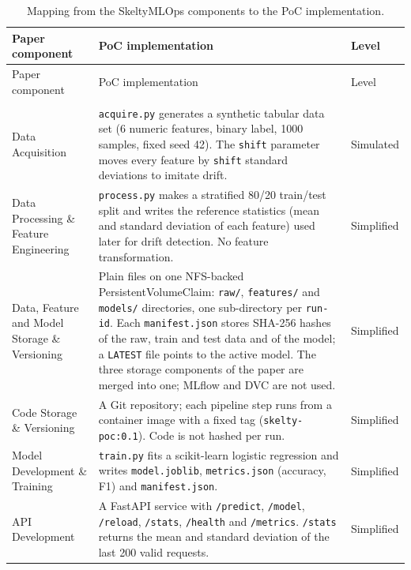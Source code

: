 {\small
\setlength{\tabcolsep}{4pt}
\begin{longtable}{@{}>{\raggedright\arraybackslash}p{3.7cm} >{\raggedright\arraybackslash}p{6.6cm} >{\raggedright\arraybackslash}p{1.9cm}@{}}
\caption{Mapping from the SkeltyMLOps components to the PoC implementation.}
\label{tab:poc-mapping}\\
\toprule
Paper component & PoC implementation & Level \\
\midrule
\endfirsthead
\toprule
Paper component & PoC implementation & Level \\
\midrule
\endhead
\midrule
\multicolumn{3}{r}{\footnotesize Continued on next page}\\
\endfoot
\bottomrule
\endlastfoot

Data Acquisition & \texttt{acquire.py} generates a synthetic tabular data set (6 numeric features, binary label, 1000 samples, fixed seed 42). The \texttt{shift} parameter moves every feature by \texttt{shift} standard deviations to imitate drift. & Simulated \\
Data Processing \& Feature Engineering & \texttt{process.py} makes a stratified 80/20 train/test split and writes the reference statistics (mean and standard deviation of each feature) used later for drift detection. No feature transformation. & Simplified \\
Data, Feature and Model Storage \& Versioning & Plain files on one NFS-backed PersistentVolumeClaim: \texttt{raw/}, \texttt{features/} and \texttt{models/} directories, one sub-directory per \texttt{run-id}. Each \texttt{manifest.json} stores SHA-256 hashes of the raw, train and test data and of the model; a \texttt{LATEST} file points to the active model. The three storage components of the paper are merged into one; MLflow and DVC are not used. & Simplified \\
Code Storage \& Versioning & A Git repository; each pipeline step runs from a container image with a fixed tag (\texttt{skelty-poc:0.1}). Code is not hashed per run. & Simplified \\
Model Development \& Training & \texttt{train.py} fits a scikit-learn logistic regression and writes \texttt{model.joblib}, \texttt{metrics.json} (accuracy, F1) and \texttt{manifest.json}. & Simplified \\
API Development & A FastAPI service with \texttt{/predict}, \texttt{/model}, \texttt{/reload}, \texttt{/stats}, \texttt{/health} and \texttt{/metrics}. \texttt{/stats} returns the mean and standard deviation of the last 200 valid requests. & Simplified \\

\end{longtable}}
